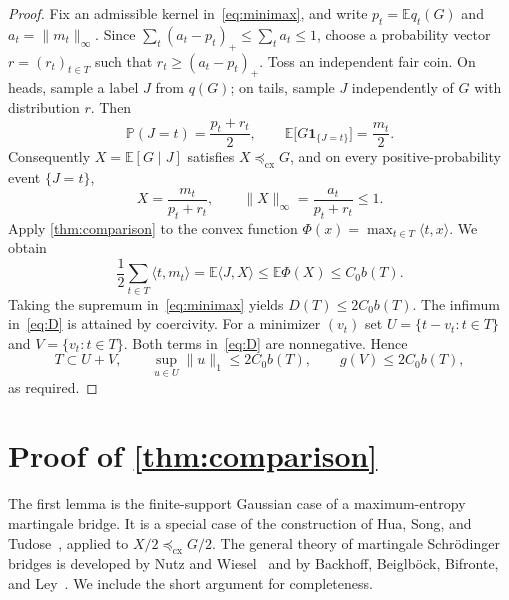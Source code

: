 \documentclass[11pt,reqno]{amsart}
\newtheorem{lemma}[theorem]{Lemma}
\newcommand{\E}{\mathbb E}
\newcommand{\Pp}{\mathbb P}
\newcommand{\cx}{\preceq_{\mathrm{cx}}}
\newcommand{\ip}[2]{\langle #1,#2\rangle}
\begin{document}
\begin{proof}
Fix an admissible kernel in~\eqref{eq:minimax}, and write
$p_t=\E q_t(G)$ and $a_t=\|m_t\|_\infty$.
Since $\sum_t(a_t-p_t)_+\leq\sum_ta_t\leq1$, choose a probability
vector $r=(r_t)_{t\in T}$ such that
$r_t\geq(a_t-p_t)_+$. Toss an independent fair coin. On heads,
sample a label $J$ from $q(G)$; on tails, sample $J$ independently
of $G$ with distribution $r$. Then
\[
 \Pp(J=t)=\frac{p_t+r_t}{2},
 \qquad
 \E\bigl[G\mathbf1_{\{J=t\}}\bigr]=\frac{m_t}{2}.
\]
Consequently $X=\E[G\mid J]$ satisfies $X\cx G$, and on every
positive-probability event $\{J=t\}$,
\[
 X=\frac{m_t}{p_t+r_t},
 \qquad
 \|X\|_\infty=\frac{a_t}{p_t+r_t}\leq1.
\]
Apply \cref{thm:comparison} to the convex function
$\Phi(x)=\max_{t\in T}\ip{t}{x}$. We obtain
\[
 \frac12\sum_{t\in T}\ip{t}{m_t}
   =\E\ip{J}{X}
   \leq\E\Phi(X)
   \leq C_0b(T).
\]
Taking the supremum in~\eqref{eq:minimax} yields
$D(T)\leq2C_0b(T)$. The infimum in~\eqref{eq:D} is attained by
coercivity. For a minimizer $(v_t)$ set
$U=\{t-v_t:t\in T\}$ and $V=\{v_t:t\in T\}$.
Both terms in~\eqref{eq:D} are nonnegative. Hence
\[
 T\subset U+V,
 \qquad
 \sup_{u\in U}\|u\|_1\leq2C_0b(T),
 \qquad
 g(V)\leq2C_0b(T),
\]
as required.
\end{proof}

\section{Proof of
  \texorpdfstring{\cref{thm:comparison}}
                 {Theorem }}
\label{sec:lifting}

The first lemma is the finite-support Gaussian case of a
maximum-entropy martingale bridge. It is a special case of the
construction of Hua, Song, and
Tudose~\cite[Proposition~3.3 and Section~4.1]{HuaSongTudose}, applied
to $X/2\cx G/2$. The general theory of martingale Schr\"odinger bridges
is developed by Nutz and Wiesel~\cite{NutzWiesel} and by Backhoff,
Beiglb\"ock, Bifronte, and Ley~\cite{BackhoffEtAl}. We include the
short argument for completeness.

\end{document}
